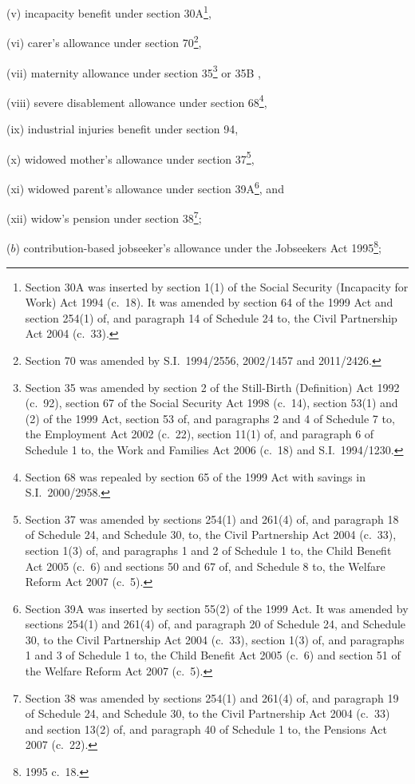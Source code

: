 \documentclass[12pt,a4paper]{article}
\begin{document}
\begin{enumerate}
\begin{enumerate}
(v) incapacity benefit under section 30A\footnote{Section 30A was inserted by section 1(1) of the Social Security (Incapacity for Work) Act 1994 (c.~18). It was amended by section 64 of the 1999 Act and section 254(1) of, and paragraph 14 of Schedule 24 to, the Civil Partnership Act 2004 (c.~33).},

(vi) carer’s allowance under section 70\footnote{Section 70 was amended by S.I.~1994/2556, 2002/1457 and 2011/2426.},

(vii) maternity allowance under section 35\footnote{Section 35 was amended by section 2 of the Still-Birth (Definition) Act 1992 (c.~92), section 67 of the Social Security Act 1998 (c.~14), section 53(1) and (2) of the 1999 Act, section 53 of, and paragraphs 2 and 4 of Schedule 7 to, the Employment Act 2002 (c.~22), section 11(1) of, and paragraph 6 of Schedule 1 to, the Work and Families Act 2006 (c.~18) and S.I.~1994/1230.}
or 35B%
,

(viii) severe disablement allowance under section 68\footnote{Section 68 was repealed by section 65 of the 1999 Act with savings in S.I.~2000/2958.},

(ix) industrial injuries benefit under section 94,

(x) widowed mother’s allowance under section 37\footnote{Section 37 was amended by sections 254(1) and 261(4) of, and paragraph 18 of Schedule 24, and Schedule 30, to, the Civil Partnership Act 2004 (c.~33), section 1(3) of, and paragraphs 1 and 2 of Schedule 1 to, the Child Benefit Act 2005 (c.~6) and sections 50 and 67 of, and Schedule 8 to, the Welfare Reform Act 2007 (c.~5).},

(xi) widowed parent’s allowance under section 39A\footnote{Section 39A was inserted by section 55(2) of the 1999 Act. It was amended by sections 254(1) and 261(4) of, and paragraph 20 of Schedule 24, and Schedule 30, to the Civil Partnership Act 2004 (c.~33), section 1(3) of, and paragraphs 1 and 3 of Schedule 1 to, the Child Benefit Act 2005 (c.~6) and section 51 of the Welfare Reform Act 2007 (c.~5).}, and

(xii) widow’s pension under section 38\footnote{Section 38 was amended by sections 254(1) and 261(4) of, and paragraph 19 of Schedule 24, and Schedule 30, to the Civil Partnership Act 2004 (c.~33) and section 13(2) of, and paragraph 40 of Schedule 1 to, the Pensions Act 2007 (c.~22).};
\end{enumerate}

($b$) contribution-based jobseeker’s allowance under the Jobseekers Act 1995\footnote{1995 c.~18.};


\end{enumerate}
\end{document}
